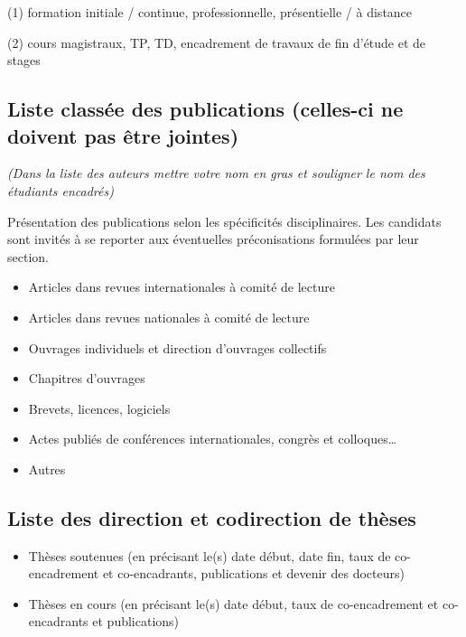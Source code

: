 \documentclass[a4paper,12pt]{article}
\newcommand{\instructions}[1]{{\color{black}#1}}
\begin{document}
\bigskip

(1) formation initiale / continue, professionnelle, présentielle / à distance

(2) cours magistraux, TP, TD, encadrement de travaux de fin d'étude et de stages

\subsection{Liste classée des publications (celles-ci ne doivent pas être jointes)}

\instructions{%
	{\em
	(Dans la liste des auteurs mettre votre nom en gras et souligner le nom des étudiants encadrés)

	Présentation des publications selon les spécificités disciplinaires. Les candidats sont invités à se reporter aux éventuelles préconisations formulées par leur section.

	\begin{itemize}
		\item Articles dans revues internationales à comité de lecture
    	\item Articles dans revues nationales à comité de lecture
    	\item Ouvrages individuels et direction d'ouvrages collectifs
    	\item Chapitres d'ouvrages
    	\item Brevets, licences, logiciels
    	\item Actes publiés de conférences internationales, congrès et colloques…
    	\item Autres
	\end{itemize}

	}
}




\subsection{Liste des direction et codirection de thèses}

\instructions{%
	{\em
	\begin{itemize}
		\item Thèses soutenues (en précisant le(s) date début, date fin, taux de co-encadrement et co­-encadrants, publications et devenir des docteurs)
    	\item Thèses en cours (en précisant le(s) date début, taux de co-encadrement et co-encadrants et publications)
	\end{itemize}

	}
}
\end{document}
